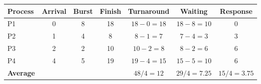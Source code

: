\begin{tabular}{@{}lcccccc@{}}
\toprule
\textbf{Process} & \textbf{Arrival} & \textbf{Burst} & \textbf{Finish} & \textbf{Turnaround} & \textbf{Waiting} & \textbf{Response}\\
\midrule
P1 & 0 & 8 & 18 & $18-0=18$ & $18-8=10$ & 0\\
P2 & 1 & 4 & 8 & $8-1=7$ & $7-4=3$ & 3\\
P3 & 2 & 2 & 10 & $10-2=8$ & $8-2=6$ & 6\\
P4 & 4 & 5 & 19 & $19-4=15$ & $15-5=10$ & 6\\
\midrule
\textbf{Average} &  &  &  & $48/4=12$ & $29/4=7.25$ & $15/4=3.75$\\
\bottomrule
\end{tabular}
